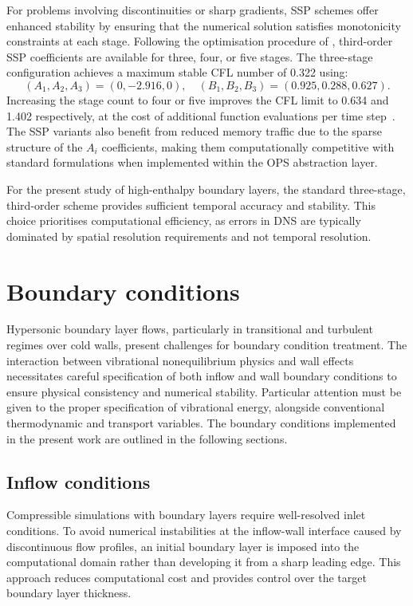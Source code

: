For problems involving discontinuities or sharp gradients, SSP schemes offer enhanced stability by ensuring that the numerical solution satisfies monotonicity constraints at each stage. Following the optimisation procedure of \citet{GottliebShu1998}, third-order SSP coefficients are available for three, four, or five stages. The three-stage configuration achieves a maximum stable \gls{CFL} number of 0.322 using:
\begin{equation}
    (A_1, A_2, A_3) = (0, -2.916, 0), \quad (B_1, B_2, B_3) = (0.925, 0.288, 0.627).
\end{equation}
Increasing the stage count to four or five improves the \gls{CFL} limit to 0.634 and 1.402 respectively, at the cost of additional function evaluations per time step~\citep{LusherEtAl2025}. The SSP variants also benefit from reduced memory traffic due to the sparse structure of the $A_i$ coefficients, making them computationally competitive with standard formulations when implemented within the \gls{OPS} abstraction layer. 

For the present study of high-enthalpy boundary layers, the standard three-stage, third-order scheme provides sufficient temporal accuracy and stability. This choice prioritises computational efficiency, as errors in DNS are typically dominated by spatial resolution requirements and not temporal resolution.

\section{Boundary conditions}
Hypersonic boundary layer flows, particularly in transitional and turbulent regimes over cold walls, present challenges for boundary condition treatment. The interaction between vibrational nonequilibrium physics and wall effects necessitates careful specification of both inflow and wall boundary conditions to ensure physical consistency and numerical stability. Particular attention must be given to the proper specification of vibrational energy, alongside conventional thermodynamic and transport variables. The boundary conditions implemented in the present work are outlined in the following sections.


\subsection{Inflow conditions}
Compressible simulations with boundary layers require well-resolved inlet conditions. To avoid numerical instabilities at the inflow-wall interface caused by discontinuous flow profiles, an initial boundary layer is imposed into the computational domain rather than developing it from a sharp leading edge. This approach reduces computational cost and provides control over the target boundary layer thickness.

